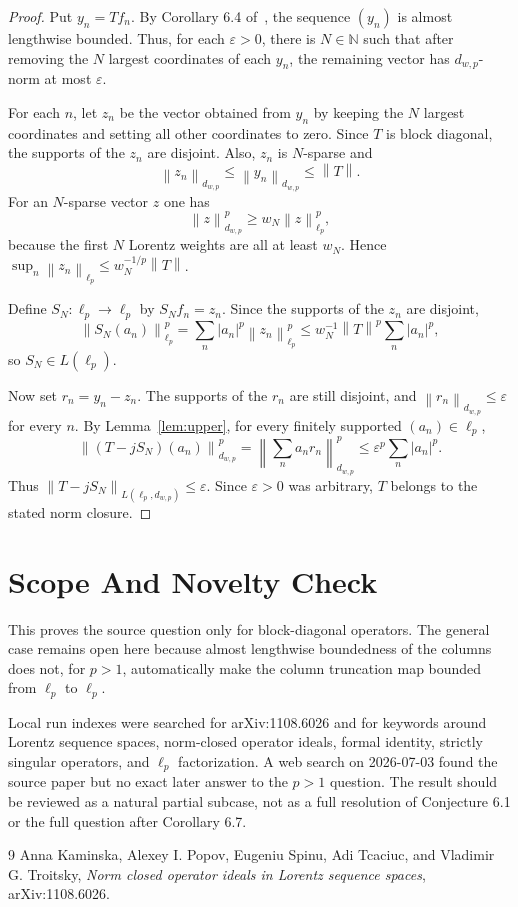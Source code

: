 \documentclass[11pt]{article}
\newcommand{\N}{\mathbb N}
\newcommand{\norm}[1]{\left\lVert #1\right\rVert}
\begin{document}
\begin{proof}
Put $y_n=Tf_n$.  By Corollary 6.4 of~\cite{KPSTT}, the sequence $(y_n)$ is
almost lengthwise bounded.  Thus, for each $\varepsilon>0$, there is
$N\in\N$ such that after removing the $N$ largest coordinates of each $y_n$,
the remaining vector has $d_{w,p}$-norm at most $\varepsilon$.

For each $n$, let $z_n$ be the vector obtained from $y_n$ by keeping the
$N$ largest coordinates and setting all other coordinates to zero.  Since
$T$ is block diagonal, the supports of the $z_n$ are disjoint.  Also,
$z_n$ is $N$-sparse and
\[
  \norm{z_n}_{d_{w,p}}\leq \norm{y_n}_{d_{w,p}}\leq \norm{T}.
\]
For an $N$-sparse vector $z$ one has
\[
  \norm{z}_{d_{w,p}}^p
  \geq
  w_N\norm{z}_{\ell_p}^p,
\]
because the first $N$ Lorentz weights are all at least $w_N$.  Hence
$\sup_n\norm{z_n}_{\ell_p}\leq w_N^{-1/p}\norm{T}$.

Define $S_N:\ell_p\to\ell_p$ by $S_Nf_n=z_n$.  Since the supports of the
$z_n$ are disjoint,
\[
  \norm{S_N(a_n)}_{\ell_p}^p
  =
  \sum_n |a_n|^p\norm{z_n}_{\ell_p}^p
  \leq
  w_N^{-1}\norm{T}^p\sum_n |a_n|^p,
\]
so $S_N\in L(\ell_p)$.

Now set $r_n=y_n-z_n$.  The supports of the $r_n$ are still disjoint, and
$\norm{r_n}_{d_{w,p}}\leq\varepsilon$ for every $n$.  By
Lemma~\ref{lem:upper}, for every finitely supported $(a_n)\in\ell_p$,
\[
  \norm{(T-jS_N)(a_n)}_{d_{w,p}}^p
  =
  \norm{\sum_n a_nr_n}_{d_{w,p}}^p
  \leq
  \varepsilon^p\sum_n |a_n|^p .
\]
Thus $\norm{T-jS_N}_{L(\ell_p,d_{w,p})}\leq\varepsilon$.  Since
$\varepsilon>0$ was arbitrary, $T$ belongs to the stated norm closure.
\end{proof}

\section*{Scope And Novelty Check}

This proves the source question only for block-diagonal operators.  The
general case remains open here because almost lengthwise boundedness of the
columns does not, for $p>1$, automatically make the column truncation map
bounded from $\ell_p$ to $\ell_p$.

Local run indexes were searched for arXiv:1108.6026 and for keywords around
Lorentz sequence spaces, norm-closed operator ideals, formal identity,
strictly singular operators, and $\ell_p$ factorization.  A web search on
2026-07-03 found the source paper but no exact later answer to the $p>1$
question.  The result should be reviewed as a natural partial subcase, not as
a full resolution of Conjecture 6.1 or the full question after Corollary 6.7.

\begin{thebibliography}{9}
Anna Kaminska, Alexey I. Popov, Eugeniu Spinu, Adi Tcaciuc, and Vladimir G.
Troitsky,
\emph{Norm closed operator ideals in Lorentz sequence spaces},
arXiv:1108.6026.
\end{thebibliography}
\end{document}
